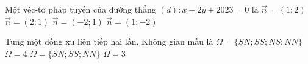 \begin{ex}%
Một véc-tơ pháp tuyến của đường thẳng $(d)\colon x-2 y+2023=0$ là
\choice
{$\overrightarrow{n}=(1;2)$}
{$\overrightarrow{n}=(2;1)$}
{$\overrightarrow{n}=(-2;1)$}
{\True $\overrightarrow{n}=(1;-2)$}
\end{ex}

\begin{ex}%
Tung một đồng xu liên tiếp hai lần. Không gian mẫu là
\choice
{\True $\Omega=\{SN; SS; NS; NN\}$}
{$\Omega=4$}
{$\Omega=\{SN; SS; NN\}$}
{$\Omega=3$}
\end{ex}

